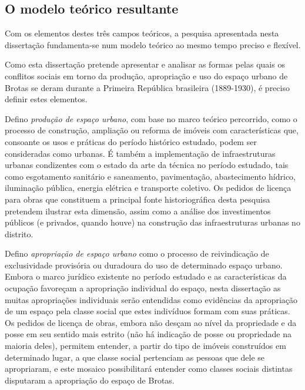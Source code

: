 \subsection[O modelo teórico resultante]{O modelo teórico resultante}
\label{subsec:modteoresult}

Com os elementos destes três campos teóricos, a pesquisa apresentada nesta dissertação fundamenta-se num modelo teórico ao mesmo tempo preciso e flexível. 

Como esta dissertação pretende apresentar e analisar as formas pelas quais os conflitos sociais em torno da produção, apropriação e uso do espaço urbano de Brotas se deram durante a Primeira República brasileira (1889-1930), é preciso definir estes elementos.

Defino \textit{produção de espaço urbano}, com base no marco teórico percorrido, como o processo de construção, ampliação ou reforma de imóveis com características que, consoante os usos e práticas do período histórico estudado, podem ser consideradas como urbanas. É também a implementação de infraestruturas urbanas condizentes com o estado da arte da técnica no período estudado, tais como esgotamento sanitário e saneamento, pavimentação, abastecimento hídrico, iluminação pública, energia elétrica e transporte coletivo. Os pedidos de licença para obras que constituem a principal fonte historiográfica desta pesquisa pretendem ilustrar esta dimensão, assim como a análise dos investimentos públicos (e privados, quando houve) na construção das infraestruturas urbanas no distrito.

Defino \textit{apropriação de espaço urbano} como o processo de reivindicação de exclusividade provisória ou duradoura do uso de determinado espaço urbano. Embora o marco jurídico existente no período estudado e as características da ocupação favoreçam a apropriação individual do espaço, nesta dissertação as muitas apropriações individuais serão entendidas como evidências da apropriação de um espaço pela classe social que estes indivíduos formam com suas práticas. Os pedidos de licença de obras, embora não desçam ao nível da propriedade e da posse em seu sentido mais estrito (não há indicação de posse ou propriedade na maioria deles), permitem entender, a partir do tipo de imóveis construídos em determinado lugar, a que classe social pertenciam as pessoas que dele se apropriaram, e este mosaico possibilitará entender como classes sociais distintas disputaram a apropriação do espaço de Brotas.

